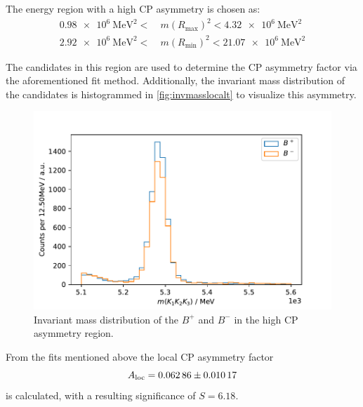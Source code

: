 The energy region with a high CP asymmetry is chosen as:
\begin{align*}
	\qty{0.98e6}{\mega\eV\tothe{2}} <\ &m(R_\mathrm{max})^2<\qty{4.32e6}{\mega\eV\tothe{2}}\\ \qty{2.92e6}{\mega\eV\tothe{2}} <\ &m(R_\mathrm{min})^2<\qty{21.07e6}{\mega\eV\tothe{2}}
\end{align*}

The candidates in this region are used to determine the CP asymmetry factor 
via the aforementioned fit method. Additionally, the invariant mass distribution 
of the candidates is histogrammed in \autoref{fig:invmasslocalt} to visualize this asymmetry.

\begin{figure}
	\centering
	\includegraphics[width=0.6\linewidth]{content/pictures/image_fin/invmassLocAlt}
	\caption{Invariant mass distribution of the $B^+$ and $B^-$ in the high CP asymmetry region.}
	\label{fig:invmasslocalt}
\end{figure}

From the fits mentioned above the local CP asymmetry factor
\begin{equation}
	A_\mathrm{loc} = \num{0.06286\pm0.01017}
\end{equation}
is calculated, with a resulting significance of $S = 6.18$.


